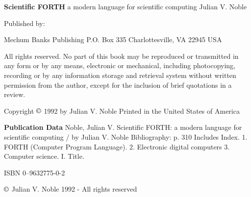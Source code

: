 \textbf{Scientific FORTH}
a modern language for scientific computing 
Julian V. Noble 

Published by:

\leftbar[1\linewidth]
Mechum Banks Publishing 
P.O. Box 335 
Charlottesville, VA 22945 USA
\endleftbar

All rights reserved. No part of this book may be reproduced or transmitted in any form or by any means, electronic or mechanical, including photocopying, recording or by any information storage and retrieval system without written permission from the author, except for the inclusion of brief quotations in a review. 

Copyright $\copyright$ 1992 by Julian V. Noble
Printed in the United States of America

\textbf{Publication Data}
Noble, Julian V.
Scientific FORTH: a modern language for scientific computing / by Julian V. Noble
Bibliography: p. 310
Includes Index. 
1. FORTH (Computer Program Language).
2. Electronic digital computers
3. Computer science. I. Title.

ISBN		0--9632775-0-2

$\copyright$ Julian V. Noble 1992 - All rights reserved